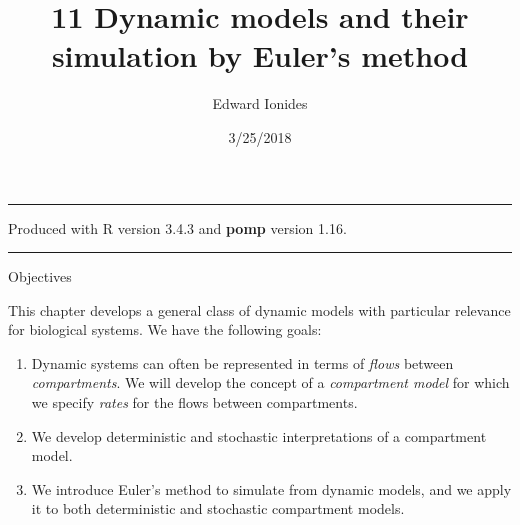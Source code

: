 \documentclass[]{article}
\title{11 Dynamic models and their simulation by Euler's method}
\author{Edward Ionides}
\date{3/25/2018}
\begin{document}
\maketitle

{
\setcounter{tocdepth}{2}
\tableofcontents
}
\newcommand\prob{\mathbb{P}}
\newcommand\E{\mathbb{E}}
\newcommand\cov{\mathrm{Cov}}
\newcommand\loglik{\ell}
\newcommand\R{\mathbb{R}}
\newcommand\data[1]{#1^*}
\newcommand\params{\, ; \,}
\newcommand\transpose{\scriptsize{T}}
\newcommand\eqspace{\quad\quad}
\newcommand\myeq[1]{\eqspace \displaystyle #1}
\newcommand\lik{\mathscr{L}}
\newcommand\profileloglik[1]{\ell^\mathrm{profile}_#1}
\newcommand\ar{\phi}
\newcommand\ma{\psi}
\newcommand\AR{\Phi}
\newcommand\MA{\Psi}
\newcommand\ev{u}
\newcommand\given{{\, | \,}}
\newcommand\equals{{=\,}}
\newcommand\matA{\mathbb{A}}
\newcommand\matB{\mathbb{B}}
\newcommand\matH{\mathbb{H}}
\newcommand\covmatX{\mathbb{U}}
\newcommand\covmatY{\mathbb{V}}


\begin{center}\rule{0.5\linewidth}{\linethickness}\end{center}

\newcommand\expect[1]{\mathbb{E}\left[{#1}\right]}
\newcommand\var[1]{\mathrm{Var}\left[{#1}\right]}
\newcommand\dist[2]{\mathrm{#1}\left(#2\right)}
\newcommand\dlta{\Delta}


Produced with R version 3.4.3 and \textbf{pomp} version 1.16.

\begin{center}\rule{0.5\linewidth}{\linethickness}\end{center}

Objectives

This chapter develops a general class of dynamic models with particular
relevance for biological systems. We have the following goals:

\begin{enumerate}
\def\labelenumi{\arabic{enumi}.}
\item
  Dynamic systems can often be represented in terms of \emph{flows}
  between \emph{compartments}. We will develop the concept of a
  \emph{compartment model} for which we specify \emph{rates} for the
  flows between compartments.
\item
  We develop deterministic and stochastic interpretations of a
  compartment model.
\item
  We introduce Euler's method to simulate from dynamic models, and we
  apply it to both deterministic and stochastic compartment models.
\end{enumerate}
\end{document}
